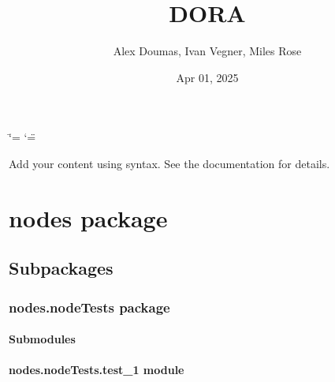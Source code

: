 \documentclass[letterpaper,10pt,english]{sphinxmanual}
\title{DORA}
\date{Apr 01, 2025}
\author{Alex Doumas, Ivan Vegner, Miles Rose}
\begin{document}
\ifdefined\shorthandoff
  \ifnum\catcode`\=\string=\active\shorthandoff{=}\fi
  \ifnum\catcode`\"=\active{}\fi
\fi

\pagestyle{empty}
\sphinxmaketitle
\pagestyle{plain}
\sphinxtableofcontents
\pagestyle{normal}
\label{\detokenize{index::doc}}


\sphinxAtStartPar
Add your content using  syntax. See the
documentation for details.

\sphinxstepscope


\chapter{nodes package}
\label{\detokenize{nodes:nodes-package}}\label{\detokenize{nodes::doc}}

\section{Subpackages}
\label{\detokenize{nodes:subpackages}}
\sphinxstepscope


\subsection{nodes.nodeTests package}
\label{\detokenize{nodes.nodeTests:nodes-nodetests-package}}\label{\detokenize{nodes.nodeTests::doc}}

\subsubsection{Submodules}
\label{\detokenize{nodes.nodeTests:submodules}}

\subsubsection{nodes.nodeTests.test\_1 module}
\label{\detokenize{nodes.nodeTests:module-nodes.nodeTests.test_1}}\label{\detokenize{nodes.nodeTests:nodes-nodetests-test-1-module}}

\begin{fulllineitems}
\label{\detokenize{nodes.nodeTests:nodes.nodeTests.test_1.test_nodes_from_file}}
\pysigstartsignatures
\pysiglinewithargsret
{}
{}
{}
\pysigstopsignatures
\end{fulllineitems}
\end{document}
